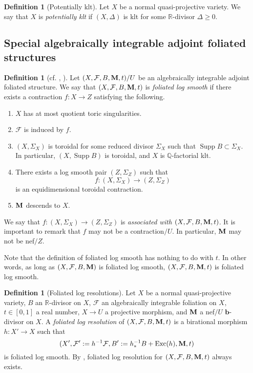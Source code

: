 \documentclass[12pt]{amsart}
\numberwithin{equation}{section}
\newcommand{\bb}{\bm{b}}
\newcommand{\Mm}{{\bf{M}}}
\newcommand{\Qq}{\mathbb{Q}}
\newcommand{\Rr}{\mathbb{R}}
\newcommand{\Exc}{\operatorname{Exc}}
\newcommand{\Supp}{\operatorname{Supp}}
\newcommand{\Ff}{\mathcal{F}}
\theoremstyle{definition}
\newtheorem{defn}[thm]{Definition}
\theoremstyle{definition}
\theoremstyle{definition}
\begin{document}
\begin{defn}[Potentially klt]\label{defn: potentially klt}
Let $X$ be a normal quasi-projective variety. We say that $X$ is \emph{potentially klt} if $(X,\Delta)$ is klt for some $\Rr$-divisor $\Delta\geq 0$. 
\end{defn}


\subsection{Special algebraically integrable adjoint foliated structures}

\begin{defn}[{cf. \cite[3.2 Log canonical foliated pairs]{ACSS21}, \cite[Definition 6.2.1]{CHLX23}}]\label{defn: foliated log smooth}
Let $(X,\Ff,B,\Mm,t)/U$ be an algebraically integrable adjoint foliated structure. We say that $(X,\Ff,B,\Mm,t)$ is \emph{foliated log smooth} if there exists a contraction $f: X\rightarrow Z$ satisfying the following.
\begin{enumerate}
  \item $X$ has at most quotient toric singularities.
  \item $\Ff$ is induced by $f$.
  \item $(X,\Sigma_X)$ is toroidal for some reduced divisor $\Sigma_X$ such that $\Supp B\subset\Sigma_X$.  In particular, $(X,\Supp B)$ is toroidal, and $X$ is $\Qq$-factorial klt.
  \item There exists a log smooth pair $(Z,\Sigma_Z)$ such that $$f: (X,\Sigma_X)\rightarrow (Z,\Sigma_Z)$$ is an equidimensional toroidal contraction.
  \item $\Mm$ descends to $X$.
\end{enumerate}
We say that $f: (X,\Sigma_X)\rightarrow (Z,\Sigma_Z)$ is \emph{associated with} $(X,\Ff,B,\Mm,t)$. It is important to remark that $f$ may not be a contraction$/U$. In particular, $\Mm$ may not be nef$/Z$.

Note that the definition of foliated log smooth has nothing to do with $t$. In other words, as long as $(X,\Ff,B,\Mm)$ is foliated log smooth, $(X,\Ff,B,\Mm,t)$ is foliated log smooth.
\end{defn}




\begin{defn}[Foliated log resolutions]\label{defn: log resolution}
Let $X$ be a normal quasi-projective variety, $B$ an $\Rr$-divisor on $X$, $\Ff$ an algebraically integrable foliation on $X$, $t\in [0,1]$ a real number, $X\rightarrow U$ a projective morphism, and $\Mm$ a nef$/U$ $\bb$-divisor on $X$. A \emph{foliated log resolution} of $(X,\Ff,B,\Mm,t)$ is a birational morphism $h: X'\rightarrow X$ such that 
$$(X',\Ff':=h^{-1}\Ff,B':=h^{-1}_\ast B+\Exc(h),\Mm,t)$$ 
is foliated log smooth. By \cite[Lemma 6.2.4]{CHLX23}, foliated log resolution for $(X,\Ff,B,\Mm,t)$ always exists.
\end{defn}
\end{document}
